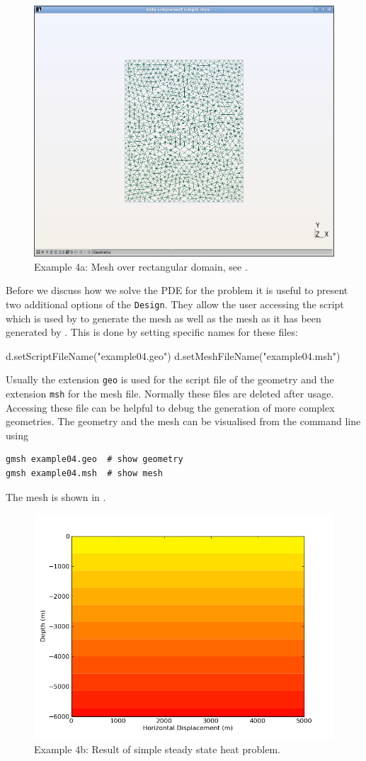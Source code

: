 \begin{figure}[ht]
\centerline{\includegraphics[width=4.in]{figures/simplemesh}}
\caption{Example 4a: Mesh over rectangular domain, see .}
\label{fig:pycad rec mesh}
\end{figure}

Before we discuss how we solve the PDE for the 
problem it is useful to present two additional options of the \verb|Design|. 
They allow the user accessing the script which is used by \gmsh to generate the mesh as well as
the mesh as it has been generated by \gmsh. This is done by setting specific names for these files: 
\begin{python}
d.setScriptFileName("example04.geo")
d.setMeshFileName("example04.msh")
\end{python}
Usually the extension \texttt{geo} is used for the script file of the \gmsh geometry and
the extension \texttt{msh} for the mesh file. Normally these files are deleted after usage. 
Accessing these file can be helpful to debug the generation of more complex geometries. The geometry and the mesh can be visualised from the command line using
\begin{verbatim}
gmsh example04.geo  # show geometry
gmsh example04.msh  # show mesh
\end{verbatim}
The mesh is shown in .
\begin{figure}[ht]
\centerline{\includegraphics[width=4.in]{figures/simpleheat}}
\caption{Example 4b: Result of simple steady state heat problem.}
\label{fig:steady state heat}
\end{figure}


